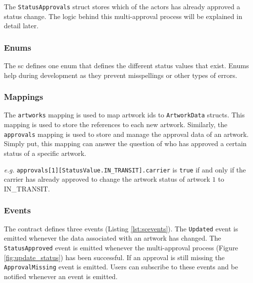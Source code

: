 The \texttt{StatusApprovals} struct stores which of the actors has already approved a status change. The logic behind this multi-approval process will be explained in detail later.



\subsubsection{Enums}
The \gls{sc} defines one enum that defines the different status values that exist. Enums help during development as they prevent misspellings or other types of errors.



\subsubsection{Mappings}
The \texttt{artworks} mapping is used to map artwork ids to \texttt{ArtworkData} structs. This mapping is used to store the references to each new artwork. Similarly, the \texttt{approvals} mapping is used to store and manage the approval data of an artwork. Simply put, this mapping can answer the question of who has approved a certain status of a specific artwork.



\textit{e.g.} \texttt{approvals[1][StatusValue.IN\_TRANSIT].carrier} is \texttt{true} if and only if the carrier has already approved to change the artwork status of artwork $1$ to IN\_TRANSIT.

\subsubsection{Events}
The contract defines three events (Listing \ref{lst:scevents}). The \texttt{Updated} event is emitted whenever the data associated with an artwork has changed. The \texttt{StatusApproved} event is emitted whenever the multi-approval process (Figure \ref{fig:update_status}) has been successful. If an approval is still missing the \texttt{ApprovalMissing} event is emitted. Users can subscribe to these events and be notified whenever an event is emitted.


